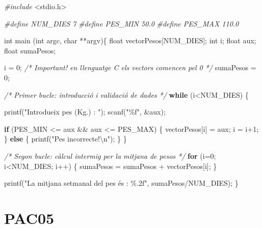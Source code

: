 \documentclass[]{book}
\newenvironment{Shaded}{\begin{snugshade}}{\end{snugshade}}
\newcommand{\CommentTok}[1]{\textcolor[rgb]{0.56,0.35,0.01}{\textit{#1}}}
\newcommand{\ControlFlowTok}[1]{\textcolor[rgb]{0.13,0.29,0.53}{\textbf{#1}}}
\newcommand{\DataTypeTok}[1]{\textcolor[rgb]{0.13,0.29,0.53}{#1}}
\newcommand{\DecValTok}[1]{\textcolor[rgb]{0.00,0.00,0.81}{#1}}
\newcommand{\ImportTok}[1]{#1}
\newcommand{\NormalTok}[1]{#1}
\newcommand{\PreprocessorTok}[1]{\textcolor[rgb]{0.56,0.35,0.01}{\textit{#1}}}
\newcommand{\SpecialCharTok}[1]{\textcolor[rgb]{0.00,0.00,0.00}{#1}}
\newcommand{\StringTok}[1]{\textcolor[rgb]{0.31,0.60,0.02}{#1}}
\begin{document}
\begin{Shaded}
\begin{Highlighting}[]
\PreprocessorTok{\#include }\ImportTok{\textless{}stdio.h\textgreater{}}

\PreprocessorTok{\#define NUM\_DIES 7}
\PreprocessorTok{\#define PES\_MIN 50.0}
\PreprocessorTok{\#define PES\_MAX 110.0}

\DataTypeTok{int}\NormalTok{ main (}\DataTypeTok{int}\NormalTok{ argc, }\DataTypeTok{char}\NormalTok{ **argv)\{}
    \DataTypeTok{float}\NormalTok{ vectorPesos[NUM\_DIES];}
    \DataTypeTok{int}\NormalTok{ i;}
    \DataTypeTok{float}\NormalTok{ aux;}
    \DataTypeTok{float}\NormalTok{ sumaPesos;}

\NormalTok{    i = }\DecValTok{0}\NormalTok{; }\CommentTok{/* Important! en llenguatge C els vectors comencen pel 0 */}
\NormalTok{    sumaPesos = }\DecValTok{0}\NormalTok{;}

    \CommentTok{/* Primer bucle: introducció i validació de dades */}
    \ControlFlowTok{while}\NormalTok{ (i\textless{}NUM\_DIES) \{}

\NormalTok{        printf(}\StringTok{"Introdueix pes (Kg.) : "}\NormalTok{);}
\NormalTok{        scanf(}\StringTok{"\%f"}\NormalTok{, \&aux);}

        \ControlFlowTok{if}\NormalTok{ (PES\_MIN \textless{}= aux \&\& aux \textless{}= PES\_MAX) \{}
\NormalTok{            vectorPesos[i] = aux;}
\NormalTok{            i = i+}\DecValTok{1}\NormalTok{;}
\NormalTok{        \} }\ControlFlowTok{else}\NormalTok{ \{}
\NormalTok{            printf(}\StringTok{"Pes incorrecte!}\SpecialCharTok{\textbackslash{}n}\StringTok{"}\NormalTok{);}
\NormalTok{        \}}
\NormalTok{    \}}

    \CommentTok{/* Segon bucle: càlcul intermig per la mitjana de pesos */}
    \ControlFlowTok{for}\NormalTok{ (i=}\DecValTok{0}\NormalTok{; i\textless{}NUM\_DIES; i++) \{}
\NormalTok{        sumaPesos = sumaPesos + vectorPesos[i];}
\NormalTok{    \}}

\NormalTok{    printf(}\StringTok{"La mitjana setmanal del pes és : \%.2f"}\NormalTok{, sumaPesos/NUM\_DIES);}
\NormalTok{\}}
\end{Highlighting}
\end{Shaded}

\hypertarget{pac05}{%
\chapter{PAC05}\label{pac05}}
\end{document}
